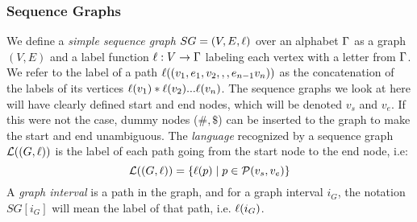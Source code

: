 \subsubsection{Sequence Graphs}
We define a \emph{simple sequence graph} $SG = (V, E, \ell)$ over an alphabet $\Gamma$ as a graph $(V, E)$ and a label function $\ell: V \rightarrow \Gamma$ labeling each vertex with a letter from $\Gamma$.
We refer to the label of a path $\ell((v_1, e_1, v_2,,,e_{n-1}v_n))$ as the concatenation of the labels of its vertices $\ell(v_1)*\ell(v_2) ... \ell(v_n)$.
The sequence graphs we look at here will have clearly defined start and end nodes, which will be denoted $v_s$ and $v_e$. If this were not the case, dummy nodes ($\#, \$$) can be inserted to the graph to make the start and end unambiguous.
The \emph{language} recognized by a sequence graph $\mathcal{L}((G, \ell))$ is the label of each path going from the start node to the end node, i.e:
\[
  \mathcal{L}((G, \ell)) = \left\{ \ell(p) \mid p \in \mathcal{P}(v_s, v_e)\right\}
\]
A \emph{graph interval} is a path in the graph, and for a graph interval $i_G$, the notation  $SG[i_G]$ will mean the label of that path, i.e. $\ell(i_G)$.

